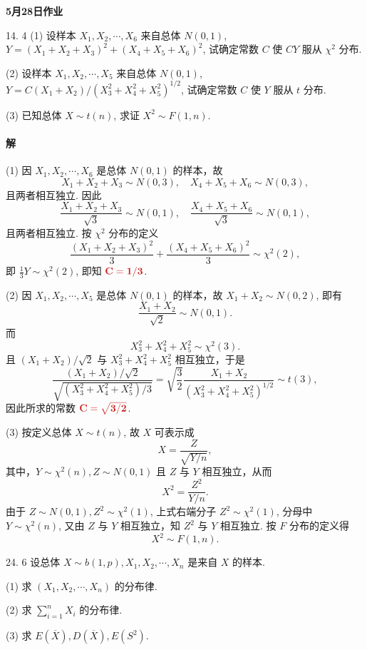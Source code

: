 \documentclass[11pt, UTF8]{ctexart}
\newcommand{\hwdate}{5月28日}
\newcommand{\ans}[1]{\mathbf{\color{fred}#1}}
\begin{document}
\begin{center}
    {\LARGE \bfseries \color{fblue} \hwdate 作业}
\end{center}

\begin{problem}{1}{4. 4}
(1) 设样本 $X_1, X_2, \cdots, X_6$ 来自总体 $N(0,1)$, $Y = (X_1+X_2+X_3)^2 + (X_4+X_5+X_6)^2$, 试确定常数 $C$ 使 $CY$ 服从 $\chi^2$ 分布.

(2) 设样本 $X_1, X_2, \cdots, X_5$ 来自总体 $N(0,1)$, $Y = C(X_1+X_2)/{(X_3^2+X_4^2+X_5^2)^{1/2}}$, 试确定常数 $C$ 使 $Y$ 服从 $t$ 分布.

(3) 已知总体 $X \sim t(n)$, 求证 $X^2 \sim F(1,n)$.
\end{problem}

\paragraph{\color{fblue}解} 
(1) 因 $X_1, X_2, \cdots, X_6$ 是总体 $N(0,1)$ 的样本，故
\[ X_1+X_2+X_3 \sim N(0,3), \quad X_4+X_5+X_6 \sim N(0,3), \]
且两者相互独立. 因此
\[ \frac{X_1+X_2+X_3}{\sqrt{3}} \sim N(0,1), \quad \frac{X_4+X_5+X_6}{\sqrt{3}} \sim N(0,1), \]
且两者相互独立. 按 $\chi^2$ 分布的定义
\[ \frac{(X_1+X_2+X_3)^2}{3} + \frac{(X_4+X_5+X_6)^2}{3} \sim \chi^2(2), \]
即 $\frac{1}{3}Y \sim \chi^2(2)$, 即知 $\ans{C = 1 / 3}$.

(2) 因 $X_1, X_2, \cdots, X_5$ 是总体 $N(0,1)$ 的样本，故 $X_1+X_2 \sim N(0,2)$, 即有
\[ \frac{X_1+X_2}{\sqrt{2}} \sim N(0,1). \]
而
\[ X_3^2+X_4^2+X_5^2 \sim \chi^2(3). \]
且 $({X_1+X_2})/{\sqrt{2}}$ 与 $X_3^2+X_4^2+X_5^2$ 相互独立，于是
\[ \frac{(X_1+X_2)/\sqrt{2}}{\sqrt{(X_3^2+X_4^2+X_5^2)/3}} = \sqrt{\frac{3}{2}} \frac{X_1+X_2}{(X_3^2+X_4^2+X_5^2)^{1/2}} \sim t(3), \]
因此所求的常数 $\ans{C = \sqrt{3 / 2}}$.

(3) 按定义总体 $X \sim t(n)$, 故 $X$ 可表示成
\[ X = \frac{Z}{\sqrt{Y/n}}, \]
其中，$Y \sim \chi^2(n), Z \sim N(0,1)$ 且 $Z$ 与 $Y$ 相互独立，从而
\[ X^2 = \frac{Z^2}{Y/n}. \]
由于 $Z \sim N(0,1), Z^2 \sim \chi^2(1)$, 上式右端分子 $Z^2 \sim \chi^2(1)$, 分母中 $Y \sim \chi^2(n)$, 又由 $Z$ 与 $Y$ 相互独立，知 $Z^2$ 与 $Y$ 相互独立. 按 $F$ 分布的定义得
\[ X^2 \sim F(1,n). \]

\vspace{1.5em}

\begin{problem}{2}{4. 6}
设总体 $X \sim b(1,p), X_1, X_2, \cdots, X_n$ 是来自 $X$ 的样本.

(1) 求 $(X_1, X_2, \cdots, X_n)$ 的分布律.

(2) 求 $\sum\limits_{i=1}^n X_i$ 的分布律.

(3) 求 $E(\overline{X}), D(\overline{X}), E(S^2)$.
\end{problem}
\end{document}
